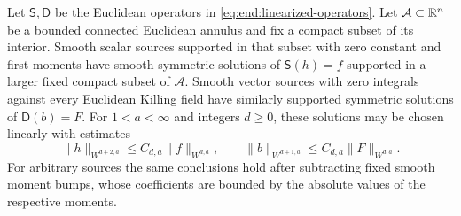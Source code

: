 \begin{lemma}\label{lem:end:compact-inverses}
Let $\mathsf S,\mathsf D$ be the Euclidean operators in
\eqref{eq:end:linearized-operators}.  Let $\mathcal A\subset\mathbb R^n$ be a bounded connected Euclidean annulus
and fix a compact subset of its interior.
Smooth scalar sources supported in that subset with zero constant
and first moments have smooth symmetric solutions of
$\mathsf S(h)=f$ supported in a larger fixed compact subset of
$\mathcal A$.  Smooth vector sources with zero integrals against
every Euclidean Killing field have similarly supported symmetric
solutions of $\mathsf D(b)=F$.  For $1<a<\infty$ and integers $d\ge0$,
these solutions may be chosen linearly with estimates
\[
 \|h\|_{W^{d+2,a}}\le C_{d,a}\|f\|_{W^{d,a}},\qquad
 \|b\|_{W^{d+1,a}}\le C_{d,a}\|F\|_{W^{d,a}}.
\]
For arbitrary sources the same conclusions hold after subtracting
fixed smooth moment bumps, whose coefficients are bounded by the
absolute values of the respective moments.
\end{lemma}

